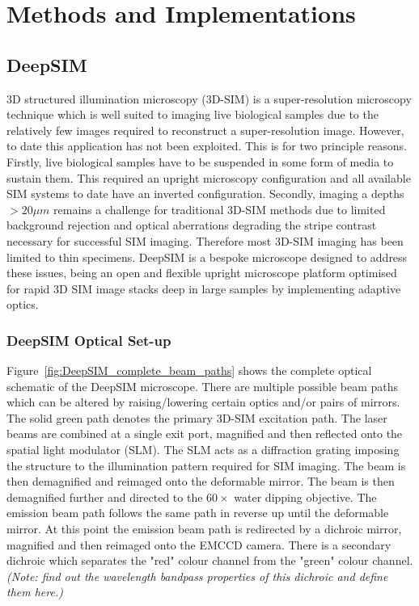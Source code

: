 \chapter{Methods and Implementations}

\section{DeepSIM}
\label{sec:DeepSIM}

3D structured illumination microscopy (3D-SIM) is a super-resolution microscopy technique which is well suited to imaging live biological samples due to the relatively few images required to reconstruct a super-resolution image. However, to date this application has not been exploited. This is for two principle reasons. Firstly, live biological samples have to be suspended in some form of media to sustain them. This required an upright microscopy configuration and all available SIM systems to date have an inverted configuration. Secondly, imaging a depths $>20\mu m$ remains a challenge for traditional 3D-SIM methods due to limited background rejection and optical aberrations degrading the stripe contrast necessary for successful SIM imaging.\cite{wu2018faster} Therefore most 3D-SIM imaging has been limited to thin specimens. DeepSIM is a bespoke microscope designed to address these issues, being an open and flexible upright microscope platform optimised for rapid 3D SIM image stacks deep in large samples by implementing adaptive optics. 

\subsection{DeepSIM Optical Set-up}
\label{subsec:DeepSIM_optics}

Figure~\ref{fig:DeepSIM_complete_beam_paths} shows the complete optical schematic of the DeepSIM microscope. There are multiple possible beam paths which can be altered by raising/lowering certain optics and/or pairs of mirrors. The solid green path denotes the primary 3D-SIM excitation path. The laser beams are combined at a single exit port, magnified and then reflected onto the spatial light modulator (SLM). The SLM acts as a diffraction grating imposing the structure to the illumination pattern required for SIM imaging. The beam is then demagnified and reimaged onto the deformable mirror. The beam is then demagnified further and directed to the $60\times$ water dipping objective. The emission beam path follows the same path in reverse up until the deformable mirror. At this point the emission beam path is redirected by a dichroic mirror, magnified and then reimaged onto the EMCCD camera. There is a secondary dichroic which separates the "red" colour channel from the "green" colour channel. \textit{(Note: find out the wavelength bandpass properties of this dichroic and define them here.)}
	
